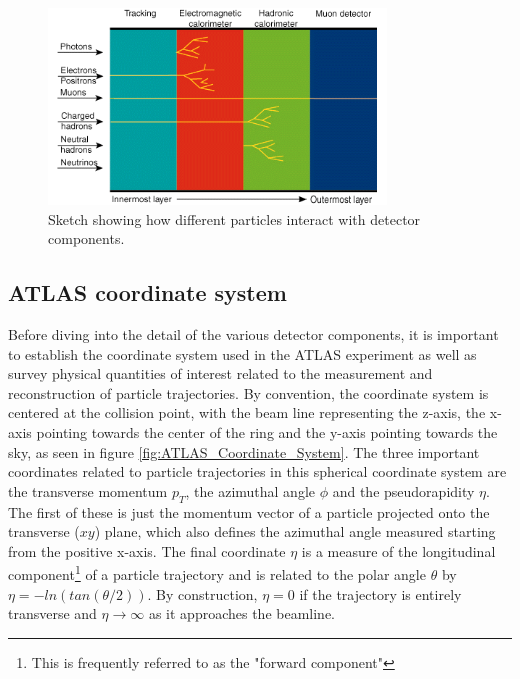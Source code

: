 \begin{figure}
\centering
    \includegraphics[width=0.8\textwidth]{images/Detector_Interactions.png}
    \caption{Sketch showing how different particles interact with detector components.}
    \label{fig:Detector_Interactions}
\end{figure}

\subsection{ATLAS coordinate system}
Before diving into the detail of the various detector components, it is important to establish the coordinate system 
used in the ATLAS experiment as well as survey physical quantities of interest related to the measurement and 
reconstruction of particle trajectories. By convention, the coordinate system is centered at the collision point, with 
the beam line representing the z-axis, the x-axis pointing towards the center of the ring and the y-axis pointing 
towards the sky, as seen in figure \ref{fig:ATLAS_Coordinate_System}. The three important coordinates related to 
particle trajectories in this spherical coordinate system are the transverse momentum $p_T$, the azimuthal angle $\phi$ 
and the pseudorapidity $\eta$. The first of these is just the momentum vector of a particle projected onto the transverse 
($xy$) plane, which also defines the azimuthal angle measured starting from the positive x-axis. The final coordinate 
$\eta$ is a measure of the longitudinal component\footnote{This is frequently referred to as the "forward component"} 
of a particle trajectory and is related to the polar angle $\theta$ by $\eta = -ln(tan(\theta/2))$. By construction, 
$\eta = 0$ if the trajectory is entirely transverse and $\eta \rightarrow \infty$ as it approaches the beamline.


